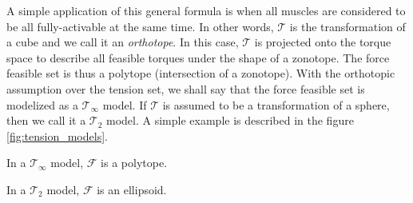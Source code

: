 A simple application of this general formula is when all muscles are considered to be all fully-activable at the same time. In other words, $\mathcal{T}$ is the transformation of a cube and we call it an \emph{orthotope}. In this case, $\mathcal{T}$ is projected onto the torque space to describe all feasible torques under the shape of a zonotope. The force feasible set is thus a polytope (intersection of a zonotope). With the orthotopic assumption over the tension set, we shall say that the force feasible set is modelized as a $\mathcal{T}_{\infty}$ model. If $\mathcal{T}$ is assumed to be a transformation of a sphere, then we call it a $\mathcal{T}_2$ model. A simple example is described in the figure \ref{fig:tension_models}.
\clearpage
\begin{minipage}{0.4\linewidth}
    \centering
    In a $\mathcal{T}_{\infty}$ model, $\mathcal{F}$ is a polytope.
\end{minipage}
\hfill
\begin{minipage}{0.4\linewidth}
    \centering
    In a $\mathcal{T}_2$ model, $\mathcal{F}$ is an ellipsoid.
\end{minipage}
